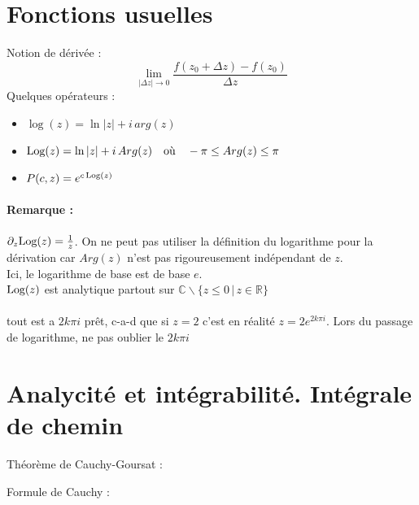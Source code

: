 \section{Fonctions usuelles}
Notion de dérivée : $$\lim_{|\Delta  z|\rightarrow 0} \frac{f(z_0+\Delta z)-f(z_0)}{\Delta z} $$
Quelques opérateurs : \begin{itemize}
\item $\log(z)=\ln|z|+i\,arg(z)$
\item $\Log(z) =\ln|z|+i\,Arg(z)\quad\text{où}\quad -\pi\leq Arg(z)\leq \pi$ 
\item $P(c,z) = e^{c\,\Log(z)}$
\end{itemize}
\paragraph{Remarque : } $\partial_z\Log(z)=\frac{1}{z}$. On ne peut pas utiliser la définition du logarithme pour la dérivation car $Arg(z)$ n'est pas rigoureusement indépendant de $z$.\\
Ici, le logarithme de base est de base  $e$.\\
$\Log(z)$ est analytique partout sur $\mathbb{C}\backslash\{z\leq 0\,|\,z\in\mathbb{R}\}$\\\\
\danger tout est a $2k\pi i$ prêt, c-a-d que si $z = 2$ c'est en réalité $z = 2e^{2k\pi i}$. Lors du passage de logarithme, ne pas oublier le $2k\pi i$
\section{Analycité et intégrabilité. Intégrale de chemin}
Théorème de Cauchy-Goursat : \begin{center}
\end{center}
\newpage
Formule de Cauchy : \begin{center}
\end{center}

